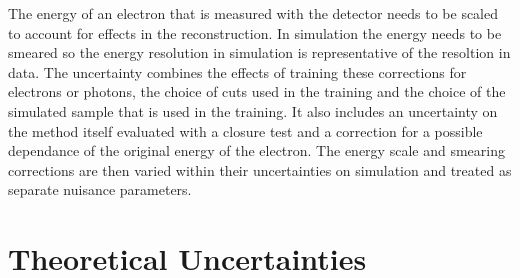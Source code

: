 The energy of an electron that is measured with the detector needs to be scaled to account for effects in the reconstruction. In simulation the energy needs to be smeared so the energy resolution in simulation is representative of the resoltion in data.
The uncertainty combines the effects of training these corrections for electrons or photons, the choice of cuts used in the training and the choice of the simulated sample that is used in the training. It also includes an uncertainty on the method itself evaluated with a closure test and a correction for a possible
dependance of the original energy of the electron.
The energy scale and smearing corrections are then varied within their uncertainties on simulation and treated as separate nuisance parameters.

\section{Theoretical Uncertainties}
\label{sec:theo_uncert}